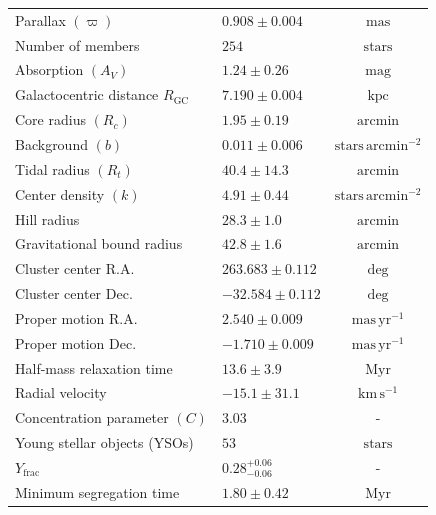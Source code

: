 \documentclass{aa}
\begin{document}
\begin{table}
{\begin{tabular}{llc}
			Parallax $(\varpi)$                     & $0.908 \pm 0.004$   & $\mathrm{mas}$                     \\
			Number of members                       & $254$               & $\mathrm{stars}$                   \\
			Absorption $(A_V)$                      & $1.24 \pm 0.26$   & $\mathrm{mag}$                     \\
			Galactocentric distance $R_\mathrm{GC}$ & $7.190 \pm 0.004$             & $\mathrm{kpc}$                     \\
			Core radius $(R_c)$                     & $1.95 \pm 0.19$  & $\mathrm{arcmin}$                  \\
			Background $(b)$                        & $0.011 \pm 0.006$  & $\mathrm{stars\,arcmin^{-2}}$      \\
			Tidal radius $(R_t)$                    & $40.4 \pm 14.3$ & $\mathrm{arcmin}$                  \\
			Center density $(k)$                    & $4.91 \pm 0.44$   & $\mathrm{stars\,arcmin^{-2}}$      \\
			Hill radius                             & $28.3 \pm 1.0$            & $\mathrm{arcmin}$                  \\
			Gravitational bound radius              & $42.8 \pm 1.6$            & $\mathrm{arcmin}$                  \\
			Cluster center R.A.                     & $263.683 \pm 0.112$ & $\mathrm{deg}$                     \\
			Cluster center Dec.                     & $-32.584 \pm 0.112$ & $\mathrm{deg}$                     \\
			Proper motion R.A.                      & $2.540 \pm 0.009$  & $\mathrm{mas\,yr^{-1}}$            \\
			Proper motion Dec.                      & $-1.710 \pm 0.009$ & $\mathrm{mas\,yr^{-1}}$            \\
			Half-mass relaxation time               & $13.6 \pm 3.9$             & $\mathrm{Myr}$                     \\
			Radial velocity                         & $-15.1 \pm 31.1$  & $\mathrm{km\,s^{-1}}$              \\
			Concentration parameter $(C)$           & $3.03$             & -                                  \\
			Young stellar objects (YSOs)            & $53$                & $\mathrm{stars}$                   \\
			$Y_{\text{frac}}$                       & $0.28^{+0.06}_{-0.06}$              & -                                  \\
			Minimum segregation time                & $1.80 \pm 0.42$             & $\mathrm{Myr}$                     \\ \hline
		\end{tabular}%
	}
	\label{tab:ngc6383_results}
\end{table}
\end{document}
